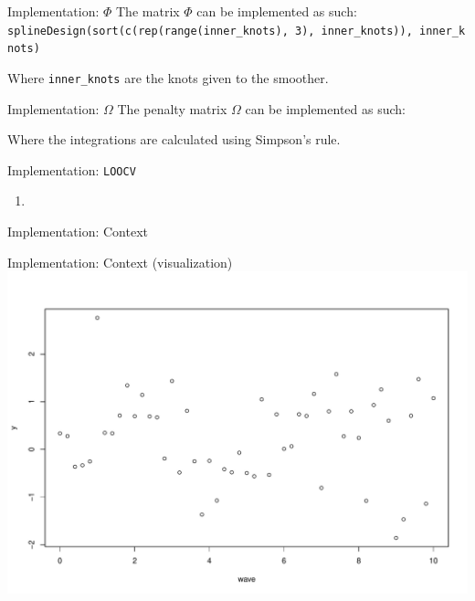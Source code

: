 \documentclass[
  ignorenonframetext,
]{beamer}
\begin{document}
\begin{frame}[fragile]{Implementation: \(\Phi\)}
\protect\hypertarget{implementation-phi}{}
The matrix \(\Phi\) can be implemented as such:\\
\texttt{splineDesign(sort(c(rep(range(inner\_knots),\ 3),\ inner\_knots)),\ inner\_knots)}

Where \texttt{inner\_knots} are the knots given to the smoother.
\end{frame}

\begin{frame}{Implementation: \(\Omega\)}
\protect\hypertarget{implementation-omega}{}
The penalty matrix \(\Omega\) can be implemented as such:

Where the integrations are calculated using Simpson's rule.
\end{frame}

\begin{frame}{Implementation: \texttt{LOOCV}}
\protect\hypertarget{implementation-loocv}{}
\begin{enumerate}
\item
\end{enumerate}
\end{frame}

\begin{frame}{Implementation: Context}
\protect\hypertarget{implementation-context}{}
\end{frame}

\begin{frame}{Implementation: Context (visualization)}
\protect\hypertarget{implementation-context-visualization}{}
\includegraphics{CSwR22_Group2_BivariateSmoothing_Presentation_files/figure-beamer/unnamed-chunk-4-1.pdf}
\end{frame}
\end{document}
